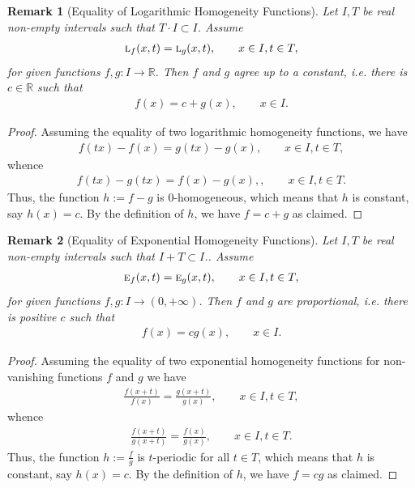 \documentclass{amsart}
\theoremstyle{plain}
\newtheorem{remark}{Remark}
\numberwithin{equation}{section}
\newcommand{\eh}{\textsc{e}}
\newcommand{\R}{{\mathbb{R}}}
\begin{document}
\begin{remark}[Equality of Logarithmic Homogeneity Functions]
Let $I, T$ be real non-empty intervals such that $T \cdot I \subset I$.
Assume 
\begin{eqnarray*}
\textsc{l}_f (x,t) = \textsc{l}_g (x,t), \qquad x \in I, t \in T,
\end{eqnarray*}
for given functions $f,g: I \to \R$.
Then $f$ and $g$ agree up to a constant, i.e. there is $c \in \R$ such that
\begin{eqnarray*}
f (x) = c + g (x), \qquad x \in I.
\end{eqnarray*}
\end{remark}

\begin{proof}
Assuming the equality of two logarithmic homogeneity functions, we have
\begin{eqnarray*}
f(tx)-f(x) = g(tx)-g(x), \qquad x \in I, t \in T,
\end{eqnarray*}
 whence
\begin{eqnarray*}
f(tx)-g(tx) =f(x) -g(x),, \qquad x \in I, t \in T.
\end{eqnarray*}
Thus, the function $h:={f}-{g}$ is $0$-homogeneous,
which means that $h$ is constant, 
say $h(x)=c$.
By the definition of $h$, we have $f= c+ g$ as claimed.
\end{proof}


\begin{remark}[Equality of Exponential Homogeneity Functions]
Let $I, T$ be real non-empty intervals such that $I + T \subset I$..
Assume 
\begin{eqnarray*}
{\eh_f}(x,t) = \eh_g (x,t), \qquad x \in I, t \in T,
\end{eqnarray*}
for given functions 
$f,g: I \to (0, +\infty)$.
Then $f$ and $g$ are proportional, i.e. there is positive $c$ such that
\begin{eqnarray*}
f (x) = c  g (x), \qquad x \in I.
\end{eqnarray*}
\end{remark}

\begin{proof}
Assuming the equality of two exponential homogeneity functions for non-vanishing functions $f$ and $g$ we have
\begin{eqnarray*}
\frac{f(x+t)}{f(x)} 
= \frac{g(x+t)}{g(x)}, \qquad x \in I, t \in T,
\end{eqnarray*}
 whence
\begin{eqnarray*}
\frac{f(x+t)}{g(x+t)} 
= \frac{f(x)}{g(x)}, \qquad x \in I, t \in T.
\end{eqnarray*}
Thus, the function $h:=\frac{f}{g}$ is $t$-periodic for all $t \in T$,
which means that $h$ is constant, say $h(x)=c$.
By the definition of $h$, 
we have $f= c g$ as claimed.
\end{proof}
\end{document}
